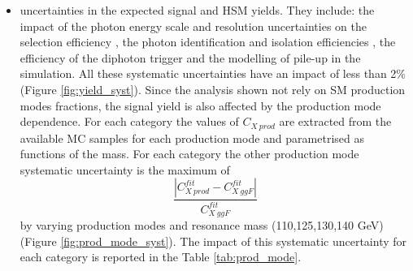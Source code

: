 \documentclass[a4paper, oneside, 11pt, openright]{book}
\begin{document}
\begin{itemize}
 					\begin{table}[tbp]
 						\centering
 						\caption{Signal and HSM $\pm1\sigma$ variations for Resolution and Scale shape systematic uncertainties for each category.}
 						\label{tab:shape}
 					\end{table}
 					\item uncertainties in the expected signal and HSM yields. They include: the impact of the photon energy scale and resolution uncertainties on the selection efficiency \cite{Aad_2019}, the photon identification and isolation efficiencies \cite{Aad_2019}, the efficiency of the diphoton trigger \cite{e_trigger} and the modelling of pile-up in the simulation. All these systematic uncertainties have an impact of less than 2\% (Figure \ref{fig:yield_syst}). Since the analysis shown not rely on SM production modes fractions, the signal yield is also affected by the production mode dependence. For each category the values of $C_{X\ prod}$ are extracted from the available MC samples for each production mode and parametrised as functions of the mass. For each category the other production mode systematic uncertainty is the maximum of  $$\dfrac{|C^{fit}_{X\ prod}-C^{fit}_{X\ ggF}|}{C^{fit}_{X\ ggF}}$$ by varying production modes and resonance mass (110,125,130,140 GeV) (Figure \ref{fig:prod_mode_syst}). The impact of this systematic uncertainty for each category is reported in the Table \ref{tab:prod_mode}.

\end{itemize}
\end{document}
